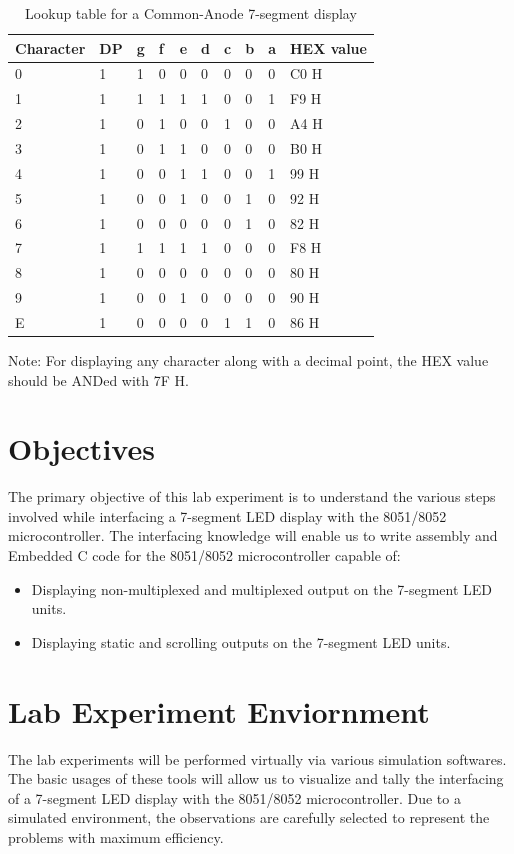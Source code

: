 \documentclass{lab_sheet}
\newcommand{\digitalpattern}[1]{
    \begin{tabular}{C{2cm}C{1cm}C{1cm}C{1cm}C{1cm}C{1cm}C{1cm}C{1cm}C{1cm}C{2cm}}
        \toprule
          Character & DP & g & f & e & d & c & b & a & HEX value\\
          \midrule
          #1
          \bottomrule
       \end{tabular}
}
\begin{document}
    \begin{table}[H]
        \centering
        \begin{threeparttable}
        \digitalpattern{
        0 & 1 & 1 & 0 & 0 & 0 & 0 & 0 & 0 & C0 H \\
        1 & 1 & 1 & 1 & 1 & 1 & 0 & 0 & 1 & F9 H \\
        2 & 1 & 0 & 1 & 0 & 0 & 1 & 0 & 0 & A4 H \\
        3 & 1 & 0 & 1 & 1 & 0 & 0 & 0 & 0 & B0 H \\
        4 & 1 & 0 & 0 & 1 & 1 & 0 & 0 & 1 & 99 H \\
        5 & 1 & 0 & 0 & 1 & 0 & 0 & 1 & 0 & 92 H \\
        6 & 1 & 0 & 0 & 0 & 0 & 0 & 1 & 0 & 82 H \\
        7 & 1 & 1 & 1 & 1 & 1 & 0 & 0 & 0 & F8 H \\
        8 & 1 & 0 & 0 & 0 & 0 & 0 & 0 & 0 & 80 H \\
        9 & 1 & 0 & 0 & 1 & 0 & 0 & 0 & 0 & 90 H \\
        E & 1 & 0 & 0 & 0 & 0 & 1 & 1 & 0 & 86 H\\}
        \begin{tablenotes}
            \small
            \item Note: For displaying any character along with a decimal point, the HEX value should be ANDed with 7F H.
          \end{tablenotes}
  \caption{Lookup table for a Common-Anode 7-segment display}
  \label{tbl:ca}
\end{threeparttable}
    \end{table}
    \section{Objectives}
    The primary objective of this lab experiment is to understand the various steps involved while interfacing a 7-segment LED display with the 8051/8052 microcontroller. The interfacing knowledge will enable us to write assembly and Embedded C code for the 8051/8052 microcontroller capable of:
    \begin{itemize}
        \item Displaying non-multiplexed and multiplexed output on the 7-segment LED units.
        \item Displaying static and scrolling outputs on the 7-segment LED units.
    \end{itemize}
    \section{Lab Experiment Enviornment}
    The lab experiments will be performed virtually via various simulation softwares. The basic usages of these tools will allow us to visualize and tally the interfacing of a 7-segment LED display with the 8051/8052 microcontroller. Due to a simulated environment, the observations are carefully selected to represent the problems with maximum efficiency.
\end{document}
